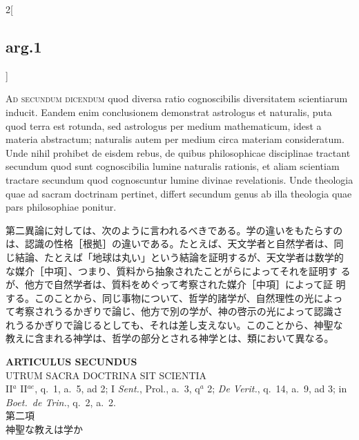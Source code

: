 \documentclass[
paper=a4paper,
fontsize=10pt,
jafontsize=9pt,
titlepage
]{jlreq}
\begin{document}
\begin{paracol}{2}[\subsection{arg.1}]
\switchcolumn*[\subsection{ad.2}]

{\scshape Ad secundum dicendum} quod diversa ratio cognoscibilis diversitatem
scientiarum inducit. Eandem enim conclusionem demonstrat astrologus et
naturalis, puta quod terra est rotunda, sed astrologus per medium
mathematicum, idest a materia abstractum; naturalis autem per medium
circa materiam consideratum. Unde nihil prohibet de eisdem rebus, de
quibus philosophicae disciplinae tractant secundum quod sunt
cognoscibilia lumine naturalis rationis, et aliam scientiam tractare
secundum quod cognoscuntur lumine divinae revelationis. Unde theologia
quae ad sacram doctrinam pertinet, differt secundum genus ab illa
theologia quae pars philosophiae ponitur.

\switchcolumn

第二異論に対しては、次のように言われるべきである。学の違いをもたらすの
は、認識の性格［根拠］の違いである。たとえば、天文学者と自然学者は、同
じ結論、たとえば「地球は丸い」という結論を証明するが、天文学者は数学的
な媒介［中項］、つまり、質料から抽象されたことがらによってそれを証明す
るが、他方で自然学者は、質料をめぐって考察された媒介［中項］によって証
明する。このことから、同じ事物について、哲学的諸学が、自然理性の光によっ
て考察されうるかぎりで論じ、他方で別の学が、神の啓示の光によって認識さ
れうるかぎりで論じるとしても、それは差し支えない。このことから、神聖な
教えに含まれる神学は、哲学の部分とされる神学とは、類において異なる。

\end{paracol}

\newpage


{}
\setcounter{section}{2}
\setcounter{subsection}{0}
\begin{center}
 {\Large {\bfseries ARTICULUS SECUNDUS}}\\
 {\large UTRUM SACRA DOCTRINA SIT SCIENTIA}\\
 {\footnotesize II$^a$ II$^{ae}$, q.~1, a.~5, ad 2; I {\itshape Sent.},
 Prol., a.~3, q$^a$ 2; {\itshape De Verit.}, q.~14, a.~9, ad 3; in
 {\itshape Boet.~de Trin.}, q.~2, a.~2.}\\
 {\Large 第二項\\神聖な教えは学か}
\end{center}
\end{document}
